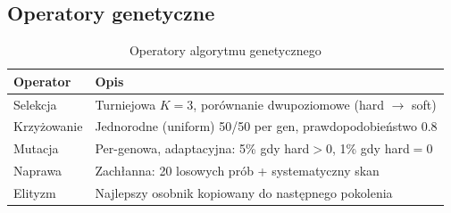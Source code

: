 \documentclass{common/sprawozdanie-agh}
\begin{document}
\subsection{Operatory genetyczne}

\begin{table}[H]
\centering
\begin{tabularx}{\textwidth}{lX}
\toprule
\textbf{Operator} & \textbf{Opis} \\
\midrule
Selekcja    & Turniejowa $K=3$, porównanie dwupoziomowe (hard $\to$ soft) \\
Krzyżowanie & Jednorodne (uniform) 50/50 per gen, prawdopodobieństwo 0.8 \\
Mutacja     & Per-genowa, adaptacyjna: 5\% gdy hard$>$0, 1\% gdy hard$=$0 \\
Naprawa     & Zachłanna: 20 losowych prób + systematyczny skan \\
Elityzm     & Najlepszy osobnik kopiowany do następnego pokolenia \\
\bottomrule
\end{tabularx}
\caption{Operatory algorytmu genetycznego}
\end{table}
\end{document}
